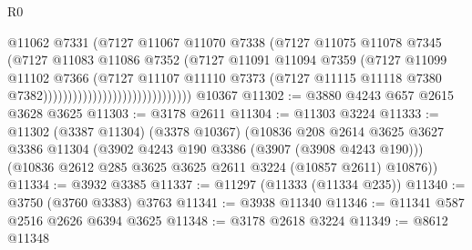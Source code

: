 \begin{lexlean}{R0}
\begin{coremodule}
                                                  @11062
                                                  @7331
                                                  (@7127
                                                    @11067
                                                    @11070
                                                    @7338
                                                    (@7127
                                                      @11075
                                                      @11078
                                                      @7345
                                                      (@7127
                                                        @11083
                                                        @11086
                                                        @7352
                                                        (@7127
                                                          @11091
                                                          @11094
                                                          @7359
                                                          (@7127
                                                            @11099
                                                            @11102
                                                            @7366
                                                            (@7127
                                                              @11107
                                                              @11110
                                                              @7373
                                                              (@7127
                                                                @11115
                                                                @11118
                                                                @7380
                                                                @7382))))))))))))))))))))))))))))))
    @10367
@11302 := @3880 @4243 @657 @2615 @3628 @3625
@11303 := @3178 @2611
@11304 := @11303 @3224
@11333 := @11302
    (@3387 @11304)
    (@3378 @10367)
    (@10836
      @208
      @2614
      @3625
      @3627
      @3386
      @11304
      (@3902 @4243 @190 @3386 (@3907 (@3908 @4243 @190)))
      (@10836 @2612 @285 @3625 @3625 @2611 @3224 (@10857 @2611) @10876))
@11334 := @3932 @3385
@11337 := @11297 (@11333 (@11334 @235))
@11340 := @3750 (@3760 @3383) @3763
@11341 := @3938 @11340
@11346 := @11341 @587 @2516 @2626 @6394 @3625
@11348 := @3178 @2618 @3224
@11349 := @8612 @11348

\end{coremodule}
\end{lexlean}
